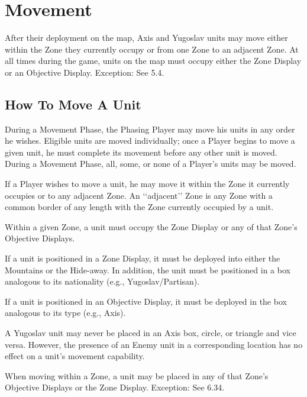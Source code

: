 \section{Movement}\label{sec:6.0}


\begin{generalrule}
After their deployment on the map, Axis and Yugoslav units may move either within the Zone they currently occupy or from one Zone to an adjacent Zone. At all times during the game, units on the map must occupy either the Zone Display or an Objective Display. Exception: See 5.4.
\end{generalrule}

\subsection{How To Move A Unit}\label{sec:6.1}

During a Movement Phase, the Phasing Player may move his units in any order he wishes. Eligible units are moved individually; once a Player begins to move a given unit, he must complete its movement before any other unit is moved. During a Movement Phase, all, some, or none of a Player’s units may be moved.

 If a Player wishes to move a unit, he may move it within the Zone it currently occupies or to any adjacent Zone. An ‘‘adjacent’’ Zone is any Zone with a common border of any length with the Zone currently occupied by a unit.

 Within a given Zone, a unit must occupy the Zone Display or any of that Zone’s Objective Displays.

 If a unit is positioned in a Zone Display, it must be deployed into either the Mountains or the Hide-away. In addition, the unit must be positioned in a box analogous to its nationality (e.g., Yugoslav/Partisan).

 If a unit is positioned in an Objective Display, it must be deployed in the box analogous to its type (e.g., Axis).

 A Yugoslav unit may never be placed in an Axis box, circle, or triangle and vice versa. However, the presence of an Enemy unit in a corresponding location has no effect on a unit’s movement capability.

 When moving within a Zone, a unit may be placed in any of that Zone’s Objective Displays or the Zone Display. Exception: See 6.34.

